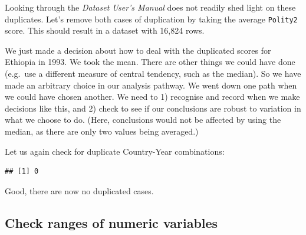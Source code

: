 \documentclass[]{book}
\makeatletter
\newenvironment{Shaded}{\begin{snugshade}}{\end{snugshade}}
\newcommand{\DataTypeTok}[1]{\textcolor[rgb]{0.13,0.29,0.53}{#1}}
\newcommand{\KeywordTok}[1]{\textcolor[rgb]{0.13,0.29,0.53}{\textbf{#1}}}
\newcommand{\NormalTok}[1]{#1}
\newcommand{\OperatorTok}[1]{\textcolor[rgb]{0.81,0.36,0.00}{\textbf{#1}}}
\newcommand{\StringTok}[1]{\textcolor[rgb]{0.31,0.60,0.02}{#1}}
\newenvironment{kframe}{%
\medskip{}
\setlength{\fboxsep}{.8em}
 \def\at@end@of@kframe{}%
 \ifinner\ifhmode%
  \def\at@end@of@kframe{\end{minipage}}%
  \begin{minipage}{\columnwidth}%
 \fi\fi%
 \def\FrameCommand##1{\hskip\@totalleftmargin \hskip-\fboxsep
 \colorbox{shadecolor}{##1}\hskip-\fboxsep
     \hskip-\linewidth \hskip-\@totalleftmargin \hskip\columnwidth}%
 \MakeFramed {\advance\hsize-\width
   \@totalleftmargin\z@ \linewidth\hsize
   \@setminipage}}%
 {\par\unskip\endMakeFramed%
 \at@end@of@kframe}
\newenvironment{rmdblock}[1]
  {
  \begin{itemize}
  \renewcommand{\labelitemi}{
    \raisebox{-.7\height}[0pt][0pt]{
      {\setkeys{Gin}{width=3em,keepaspectratio}\texttt{[image: images/\#1]}}
    }
  }
  \setlength{\fboxsep}{1em}
  \begin{kframe}
  \item
  }
  {
  \end{kframe}
  \end{itemize}
  }
\newenvironment{warning}
  {\begin{rmdblock}{warning}}
  {\end{rmdblock}}
\makeatother
\begin{document}
Looking through the \emph{Dataset User's Manual} does not readily shed light on these duplicates. Let's remove both cases of duplication by taking the average \texttt{Polity2} score. This should result in a dataset with 16,824 rows.

\begin{Shaded}
\end{Shaded}

\begin{warning}
We just made a decision about how to deal with the duplicated scores for
Ethiopia in 1993. We took the mean. There are other things we could have
done (e.g.~use a different measure of central tendency, such as the
median). So we have made an arbitrary choice in our analysis pathway. We
went down one path when we could have chosen another. We need to 1)
recognise and record when we make decisions like this, and 2) check to
see if our conclusions are robust to variation in what we choose to do.
(Here, conclusions would not be affected by using the median, as there
are only two values being averaged.)
\end{warning}

Let us again check for duplicate Country-Year combinations:

\begin{Shaded}
\end{Shaded}

\begin{verbatim}
## [1] 0
\end{verbatim}

Good, there are now no duplicated cases.

\hypertarget{check-ranges-of-numeric-variables}{%
\subsection{Check ranges of numeric variables}\label{check-ranges-of-numeric-variables}}
\end{document}
